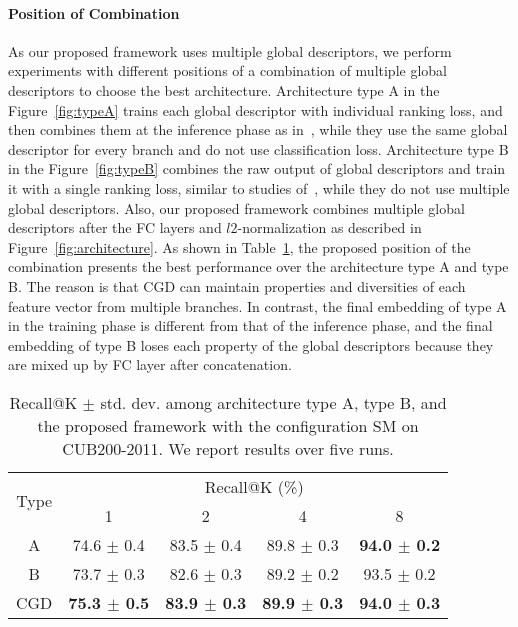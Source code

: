 \documentclass[10pt,twocolumn,letterpaper]{article}
\begin{document}
\begin{CJK}{UTF8}{mj}
\paragraph{Position of Combination} \label{sec:position_of_combination}
As our proposed framework uses multiple global descriptors, we perform experiments with different positions of a combination of multiple global descriptors to choose the best architecture.
Architecture type A in the Figure~\ref{fig:typeA} trains each global descriptor with individual ranking loss, and then combines them at the inference phase as in~\cite{Kim_2018_ECCV}, while they use the same global descriptor for every branch and do not use classification loss.
Architecture type B in the Figure~\ref{fig:typeB} combines the raw output of global descriptors and train it with a single ranking loss, similar to studies of~\cite{shen2017learning, suvisual}, while they do not use multiple global descriptors.
Also, our proposed framework combines multiple global descriptors after the FC layers and $l2$-normalization as described in Figure~\ref{fig:architecture}.
As shown in Table~\ref{table:architecture_type}, the proposed position of the combination presents the best performance over the architecture type A and type B.
The reason is that CGD can maintain properties and diversities of each feature vector from multiple branches.
In contrast, the final embedding of type A in the training phase is different from that of the inference phase, and the final embedding of type B loses each property of the global descriptors because they are mixed up by FC layer after concatenation.

\begin{table}[t!]
\begin{center}
\begin{adjustbox}{width=0.95\columnwidth,center}
\begin{tabular}{c|cccc}
\hline
\multirow{2}{*}{Type}   & \multicolumn{4}{c}{Recall@K (\%)} \\ \cline{2-5} 
                        & 1                     & 2                     & 4                     & 8                     \\
                       \hline\hline
A                       & 74.6 $\pm$ 0.4	        & 83.5 $\pm$ 0.4	        & 89.8 $\pm$ 0.3	        & \textbf{94.0 $\pm$ 0.2}   \\
B                       & 73.7 $\pm$ 0.3	        & 82.6 $\pm$ 0.3	        & 89.2 $\pm$ 0.2	        & 93.5 $\pm$ 0.2            \\
CGD                 & \textbf{75.3 $\pm$ 0.5}	& \textbf{83.9 $\pm$ 0.3}	& \textbf{89.9 $\pm$ 0.3}	& \textbf{94.0 $\pm$ 0.3}   \\ \hline
\end{tabular}
\end{adjustbox}
\end{center}
\caption{Recall@K $\pm$ std. dev. among architecture type A, type B, and the proposed framework with the configuration SM on CUB200-2011.
We report results over five runs.}
\label{table:architecture_type}
\end{table}


\end{CJK}
\end{document}
